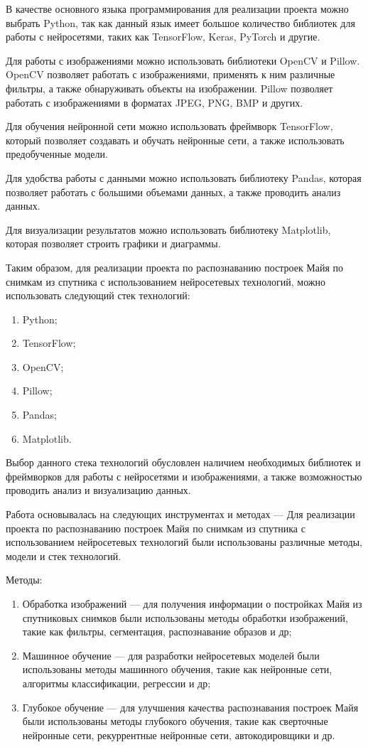     В качестве основного языка программирования для реализации проекта можно выбрать Python, так как данный язык имеет большое количество библиотек для работы с нейросетями, таких как TensorFlow, Keras, PyTorch и другие. 
    
    Для работы с изображениями можно использовать библиотеки OpenCV и Pillow. OpenCV позволяет работать с изображениями, применять к ним различные фильтры, а также обнаруживать объекты на изображении. Pillow позволяет работать с изображениями в форматах JPEG, PNG, BMP и других. 
    
    Для обучения нейронной сети можно использовать фреймворк TensorFlow, который позволяет создавать и обучать нейронные сети, а также использовать предобученные модели. 
    
    Для удобства работы с данными можно использовать библиотеку Pandas, которая позволяет работать с большими объемами данных, а также проводить анализ данных. 
    
    Для визуализации результатов можно использовать библиотеку Matplotlib, которая позволяет строить графики и диаграммы. 
    
    Таким образом, для реализации проекта по распознаванию построек Майя по снимкам из спутника с использованием нейросетевых технологий, можно использовать следующий стек технологий: 
    \begin{enumerate}
        \item Python;
        \item TensorFlow;
        \item OpenCV;
        \item Pillow;
        \item Pandas;
        \item Matplotlib.
    \end{enumerate}

    Выбор данного стека технологий обусловлен наличием необходимых библиотек и фреймворков для работы с нейросетями и изображениями, а также возможностью проводить анализ и визуализацию данных.

    Работа основывалась на следующих инструментах и методах — Для реализации проекта по распознаванию построек Майя по снимкам из спутника с использованием нейросетевых технологий были использованы различные методы, модели и стек технологий.
    
    Методы:
    \begin{enumerate}
        \item Обработка изображений — для получения информации о постройках Майя из спутниковых снимков были использованы методы обработки изображений, такие как фильтры, сегментация, распознавание образов и др;
        \item Машинное обучение — для разработки нейросетевых моделей были использованы методы машинного обучения, такие как нейронные сети, алгоритмы классификации, регрессии и др;
        \item Глубокое обучение — для улучшения качества распознавания построек Майя были использованы методы глубокого обучения, такие как сверточные нейронные сети, рекуррентные нейронные сети, автокодировщики и др.
    \end{enumerate}


